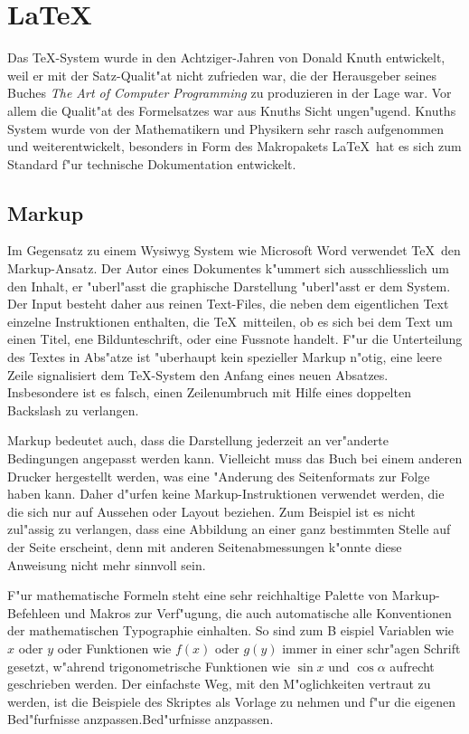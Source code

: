 \documentclass[a4paper,12pt]{article}
\begin{document}
\section{\LaTeX}
Das \TeX-System wurde in den Achtziger-Jahren von Donald Knuth entwickelt,
weil er mit der Satz-Qualit"at nicht zufrieden war, die der Herausgeber
seines Buches {\em The Art of Computer Programming} zu produzieren in
der Lage war.
Vor allem die Qualit"at des Formelsatzes war aus Knuths Sicht 
ungen"ugend.
Knuths System wurde von der Mathematikern und Physikern sehr rasch
aufgenommen und weiterentwickelt, besonders in Form des Makropakets
\LaTeX\ hat es sich zum Standard f"ur technische Dokumentation
entwickelt.

\subsection{Markup}
Im Gegensatz zu einem Wysiwyg System wie Microsoft Word verwendet
\TeX\ den Markup-Ansatz.
Der Autor eines Dokumentes k"ummert sich ausschliesslich um den Inhalt,
er "uberl"asst die graphische Darstellung "uberl"asst er dem System.
Der Input besteht daher aus reinen Text-Files, die neben dem eigentlichen
Text einzelne Instruktionen enthalten, die \TeX\ mitteilen, ob es sich
bei dem Text um einen Titel, ene Bildunteschrift, oder eine Fussnote
handelt.
F"ur die Unterteilung des Textes in Abs"atze ist "uberhaupt
kein spezieller Markup n"otig, eine leere Zeile signalisiert
dem \TeX-System den Anfang eines neuen Absatzes.
Insbesondere ist es falsch, einen Zeilenumbruch mit Hilfe eines
doppelten Backslash zu verlangen.

Markup bedeutet auch, dass die Darstellung jederzeit an ver"anderte
Bedingungen angepasst werden kann.
Vielleicht muss das Buch bei einem anderen Drucker hergestellt
werden, was eine "Anderung des Seitenformats zur Folge haben kann.
Daher d"urfen keine Markup-Instruktionen verwendet werden, die die
sich nur auf Aussehen oder Layout beziehen.
Zum Beispiel ist es nicht zul"assig zu verlangen, dass eine Abbildung
an einer ganz bestimmten Stelle auf der Seite erscheint, denn mit
anderen Seitenabmessungen k"onnte diese Anweisung nicht mehr sinnvoll
sein.

F"ur mathematische Formeln steht eine sehr reichhaltige Palette von
Markup-Befehleen und Makros zur Verf"ugung, die auch automatische
alle Konventionen der mathematischen Typographie einhalten.
So sind zum B eispiel Variablen wie $x$ oder $y$ oder Funktionen wie
$f(x)$ oder $g(y)$ immer in einer schr"agen Schrift gesetzt, w"ahrend
trigonometrische Funktionen wie $\sin x$ und $\cos \alpha$ aufrecht
geschrieben werden.
Der einfachste Weg, mit den M"oglichkeiten vertraut zu werden,
ist die Beispiele des Skriptes als Vorlage zu nehmen und f"ur die
eigenen Bed"furfnisse anzpassen.Bed"urfnisse anzpassen.
\end{document}
